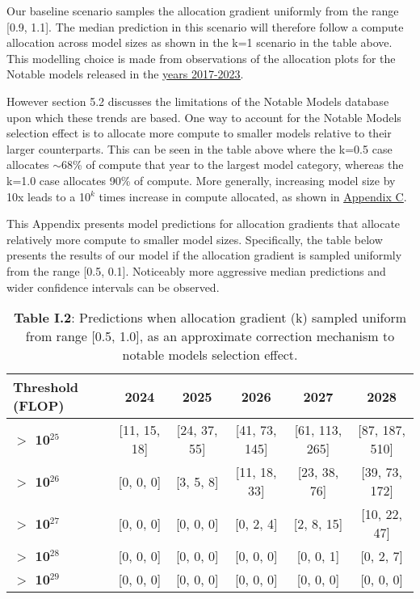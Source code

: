 \documentclass[11pt]{article}
\begin{document}
Our baseline scenario samples the allocation gradient uniformly from the range [0.9, 1.1]. The median prediction in this scenario will therefore follow a compute allocation across model sizes as shown in the k=1 scenario in the table above. This modelling choice is made from observations of the allocation plots for the Notable models released in the \underline{\hyperref[appendix-d-historical-values-of-allocation-gradients]{years 2017-2023}}.

However section 5.2 discusses the limitations of the Notable Models database upon which these trends are based. One way to account for the Notable Models selection effect is to allocate more compute to smaller models relative to their larger counterparts. This can be seen in the table above where the k=0.5 case allocates $\sim$68\% of compute that year to the largest model category, whereas the k=1.0 case allocates 90\% of compute. More generally, increasing model size by 10x leads to a 10$^k$ times increase in compute allocated, as shown in \underline{\hyperref[appendix-c-constraints-and-interpretation-of-the-linear-fits]{Appendix C}}.

This Appendix presents model predictions for allocation gradients that allocate relatively more compute to smaller model sizes. Specifically, the table below presents the results of our model if the allocation gradient is sampled uniformly from the range [0.5, 0.1]. Noticeably more aggressive median predictions and wider confidence intervals can be observed.

\begin{table}[h]
\centering
\caption*{\textbf{Table I.2}: Predictions when allocation gradient (k) sampled uniform from range [0.5, 1.0], as an approximate correction mechanism to notable models selection effect.}
\begin{tabular}{|l|c|c|c|c|c|}
\hline
\textbf{Threshold (FLOP)} & \textbf{2024} & \textbf{2025} & \textbf{2026} & \textbf{2027} & \textbf{2028} \\
\hline
\textbf{$>$ 10$^{25}$} & [11, 15, 18] & [24, 37, 55] & [41, 73, 145] & [61, 113, 265] & [87, 187, 510] \\
\hline
\textbf{$>$ 10$^{26}$} & [0, 0, 0] & [3, 5, 8] & [11, 18, 33] & [23, 38, 76] & [39, 73, 172] \\
\hline
\textbf{$>$ 10$^{27}$} & [0, 0, 0] & [0, 0, 0] & [0, 2, 4] & [2, 8, 15] & [10, 22, 47] \\
\hline
\textbf{$>$ 10$^{28}$} & [0, 0, 0] & [0, 0, 0] & [0, 0, 0] & [0, 0, 1] & [0, 2, 7] \\
\hline
\textbf{$>$ 10$^{29}$} & [0, 0, 0] & [0, 0, 0] & [0, 0, 0] & [0, 0, 0] & [0, 0, 0] \\
\hline
\end{tabular}
\end{table}
\end{document}
